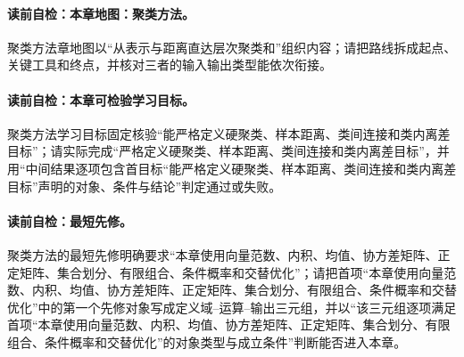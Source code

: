 \paragraph{读前自检：本章地图：聚类方法。}聚类方法章地图以“从表示与距离直达层次聚类和\kMeans{}”组织内容；请把路线拆成起点、关键工具和终点，并核对三者的输入输出类型能依次衔接。\par

\label{struct:V4-C02-CH01}
\paragraph{读前自检：本章可检验学习目标。}聚类方法学习目标固定核验“能严格定义硬聚类、样本距离、类间连接和类内离差目标”；请实际完成“严格定义硬聚类、样本距离、类间连接和类内离差目标”，并用“中间结果逐项包含首目标“能严格定义硬聚类、样本距离、类间连接和类内离差目标”声明的对象、条件与结论”判定通过或失败。\par


\label{struct:V4-C02-CH02}
\paragraph{读前自检：最短先修。}聚类方法的最短先修明确要求“本章使用向量范数、内积、均值、协方差矩阵、正定矩阵、集合划分、有限组合、条件概率和交替优化”；请把首项“本章使用向量范数、内积、均值、协方差矩阵、正定矩阵、集合划分、有限组合、条件概率和交替优化”中的第一个先修对象写成定义域--运算--输出三元组，并以“该三元组逐项满足首项“本章使用向量范数、内积、均值、协方差矩阵、正定矩阵、集合划分、有限组合、条件概率和交替优化”的对象类型与成立条件”判断能否进入本章。\par

